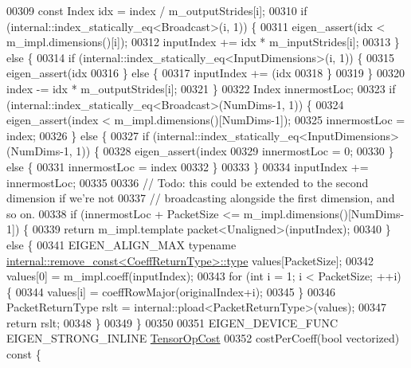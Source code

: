 \begin{DoxyCode}
00309       \textcolor{keyword}{const} Index idx = index / m\_outputStrides[i];
00310       \textcolor{keywordflow}{if} (internal::index\_statically\_eq<Broadcast>(i, 1)) \{
00311         eigen\_assert(idx < m\_impl.dimensions()[i]);
00312         inputIndex += idx * m\_inputStrides[i];
00313       \} \textcolor{keywordflow}{else} \{
00314         \textcolor{keywordflow}{if} (internal::index\_statically\_eq<InputDimensions>(i, 1)) \{
00315           eigen\_assert(idx %
00316         \} \textcolor{keywordflow}{else} \{
00317           inputIndex += (idx %
00318         \}
00319       \}
00320       index -= idx * m\_outputStrides[i];
00321     \}
00322     Index innermostLoc;
00323     \textcolor{keywordflow}{if} (internal::index\_statically\_eq<Broadcast>(NumDims-1, 1)) \{
00324       eigen\_assert(index < m\_impl.dimensions()[NumDims-1]);
00325       innermostLoc = index;
00326     \} \textcolor{keywordflow}{else} \{
00327       \textcolor{keywordflow}{if} (internal::index\_statically\_eq<InputDimensions>(NumDims-1, 1)) \{
00328         eigen\_assert(index %
00329         innermostLoc = 0;
00330       \} \textcolor{keywordflow}{else} \{
00331         innermostLoc = index %
00332       \}
00333     \}
00334     inputIndex += innermostLoc;
00335 
00336     \textcolor{comment}{// Todo: this could be extended to the second dimension if we're not}
00337     \textcolor{comment}{// broadcasting alongside the first dimension, and so on.}
00338     \textcolor{keywordflow}{if} (innermostLoc + PacketSize <= m\_impl.dimensions()[NumDims-1]) \{
00339       \textcolor{keywordflow}{return} m\_impl.template packet<Unaligned>(inputIndex);
00340     \} \textcolor{keywordflow}{else} \{
00341       EIGEN\_ALIGN\_MAX \textcolor{keyword}{typename} \hyperlink{group___sparse_core___module}{internal::remove\_const<CoeffReturnType>::type}
       values[PacketSize];
00342       values[0] = m\_impl.coeff(inputIndex);
00343       \textcolor{keywordflow}{for} (\textcolor{keywordtype}{int} i = 1; i < PacketSize; ++i) \{
00344         values[i] = coeffRowMajor(originalIndex+i);
00345       \}
00346       PacketReturnType rslt = internal::pload<PacketReturnType>(values);
00347       \textcolor{keywordflow}{return} rslt;
00348     \}
00349   \}
00350 
00351   EIGEN\_DEVICE\_FUNC EIGEN\_STRONG\_INLINE \hyperlink{class_eigen_1_1_tensor_op_cost}{TensorOpCost}
00352   costPerCoeff(\textcolor{keywordtype}{bool} vectorized)\textcolor{keyword}{ const }\{

\end{DoxyCode}
